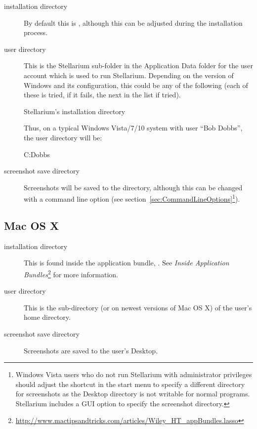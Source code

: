 \begin{description}
\item[installation directory] By default this is
  ,
  although this can be adjusted during the installation process.
\item[user directory] This is the Stellarium sub-folder in the
  Application Data folder for the user account which is used to run
  Stellarium. Depending on the version of Windows and its configuration,
  this could be any of the following (each of these is tried, if it
  fails, the next in the list if tried).

\begin{commands}
Stellarium's installation directory
\end{commands}

Thus, on a typical Windows Vista/7/10 system with user ``Bob
Dobbs'', the user directory will be:

\begin{commands}
C:\Users\Bob Dobbs\AppData\Roaming\Stellarium\
\end{commands}

\item[screenshot save directory] Screenshots will be saved to the
  \file{Pictures/Stellarium} directory, although this can be changed with a command line option (see
  section~\ref{sec:CommandLineOptions}\footnote{Windows Vista users who do not run Stellarium with
    administrator privileges should adjust the shortcut in the start
    menu to specify a different directory for screenshots as the Desktop
    directory is not writable for normal programs. 
    Stellarium includes a GUI option to specify the screenshot
    directory.}).
\end{description}

\subsection{Mac OS X}
\label{sec:FilesAndDirectories:MacOSX}

\begin{description}
\item[installation directory] This is found inside the application
  bundle, \file{Stellarium.app}. See \emph{Inside Application
    Bundles}\footnote{\url{http://www.mactipsandtricks.com/articles/Wiley_HT_appBundles.lasso}}
  for more information.
\item[user directory] This is the sub-directory 
   (or
   on
  newest versions of Mac OS X) of the user's home
  directory.
\item[screenshot save directory] Screenshots are saved to the user's
  Desktop.
\end{description}

